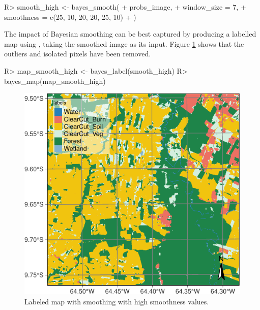 \documentclass[
  shortnames]{jss}
\begin{document}
\begin{CodeChunk}
\begin{CodeInput}
R> smooth_high <- bayes_smooth(
+     probs_image,
+     window_size = 7,
+     smoothness = c(25, 10, 20, 20, 25, 10)
+ )
\end{CodeInput}
\end{CodeChunk}

The impact of Bayesian smoothing can be best captured by producing a labelled map using , taking the smoothed image as its input. Figure \ref{fig:smth1} shows that the outliers and isolated pixels have been removed.

\begin{CodeChunk}
\begin{CodeInput}
R> map_smooth_high <- bayes_label(smooth_high)
R> bayes_map(map_smooth_high)
\end{CodeInput}
\begin{figure}[h]

{\centering \includegraphics{Bayesian_smoothing_JSS_files/figure-latex/smth1-1} 

}

\caption[Labeled map with smoothing with high smoothness values]{Labeled map with smoothing with high smoothness values.}\label{fig:smth1}
\end{figure}
\end{CodeChunk}
\end{document}
